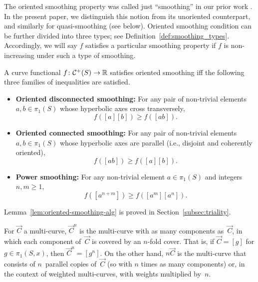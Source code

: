 The oriented smoothing property was called just ``smoothing'' in our prior work
\cite{MGT21:Smoothings}. In the present paper,
we distinguish this notion from its unoriented counterpart, and
similarly for quasi-smoothing (see below).
Oriented smoothing condition can be further divided into three
types; see
Definition~\ref{def:smoothing_types}.  Accordingly, we will
say $f$ satisfies a particular smoothing property if $f$ is
non-increasing under such a type of smoothing.

\begin{lemma}
\label{lem:oriented-smoothing-alg}
  A curve functional $f \colon \mathcal{C}^+(S) \to \mathbb{R}$ satisfies oriented smoothing iff the following three families of inequalities are satisfied.
\begin{itemize}

\item \textbf{Oriented disconnected smoothing:}
For any pair of non-trivial elements $a,b \in \pi_1(S)$ whose hyperbolic axes cross transversely,
\begin{equation}\label{eq:or-disconn-smoothing}
f([a][b]) \ge f([ab]).
\end{equation}
\item \textbf{Oriented connected smoothing:}
For any pair of non-trivial elements $a,b \in \pi_1(S)$ whose hyperbolic axes are parallel
(i.e., disjoint and coherently oriented),
\begin{equation}\label{eq:or-conn-smoothing}
f([ab]) \ge f([a][b]).
\end{equation}
\item \textbf{Power smoothing:}
For any non-trivial element $a \in \pi_1(S)$ and integers $n,m \ge 1$,
\begin{equation}
f([a^{n+m}]) \ge f([a^m][a^n]).
\label{eq:power_smoothing}
\end{equation}
\end{itemize}
\end{lemma}

Lemma~\ref{lem:oriented-smoothing-alg}
is proved in
Section~\ref{subsec:triality}.

\begin{definition}
  For $\vec{C}$ a multi-curve, $\vec{C}^n$ is the multi-curve with as many components as~$\vec{C}$, in which each component of~$\vec{C}$ is covered by an $n$-fold cover. That is, if $\vec{C} =
  [g]$ for $g \in \pi_1(S,x)$, then $\vec{C}^n = [g^n]$.
  On the other hand, $n\vec{C}$ is the multi-curve that consists of $n$~parallel copies of~$\vec{C}$ (so with $n$ times as many components) or, in the context of weighted multi-curves,
  with weights multiplied by~$n$.
\end{definition}

